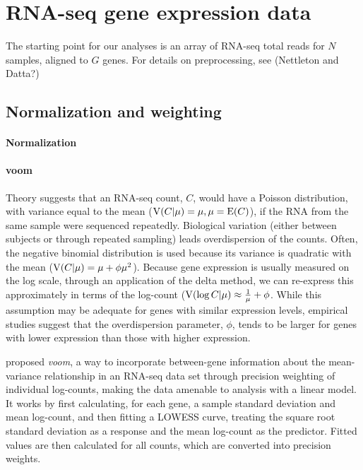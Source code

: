 \citet{liu}

\section{RNA-seq gene expression data}
\label{sec:data}
The starting point for our analyses is an array of RNA-seq total reads for $N$ samples, aligned to $G$ genes. For details on preprocessing, see (Nettleton and Datta?) 

\subsection{Normalization and weighting}
\paragraph{Normalization}


\paragraph{voom}
Theory suggests that an RNA-seq count, $C$, would have a Poisson distribution, with variance equal to the mean ($\operatorname{V}(C|\mu)=\mu, \mu=\operatorname{E}(C)$), if the RNA from the same sample were sequenced repeatedly. Biological variation (either between subjects or through repeated sampling) leads overdispersion of the counts. Often, the negative binomial distribution is used because its variance is quadratic with the mean ($\operatorname{V}(C|\mu)=\mu+\phi\mu^2$). Because gene expression is usually measured on the log scale, through an application of the delta method, we can re-express this approximately in terms of the log-count ($\operatorname{V}(\log C|\mu) \approx \frac{1}{\mu} + \phi$. While this assumption may be adequate for genes with similar expression levels, empirical studies suggest that the overdispersion parameter, $\phi$, tends to be larger for genes with lower expression than those with higher expression.

\cite{voom} proposed \textit{voom}, a way to incorporate between-gene information about the mean-variance relationship in an RNA-seq data set through precision weighting of individual log-counts, making the data amenable to analysis with a linear model. It works by first calculating, for each gene, a sample standard deviation and mean log-count, and then fitting a LOWESS curve, treating the square root standard deviation as a response and the mean log-count as the predictor. Fitted values are then calculated for all counts, which are converted into precision weights.

